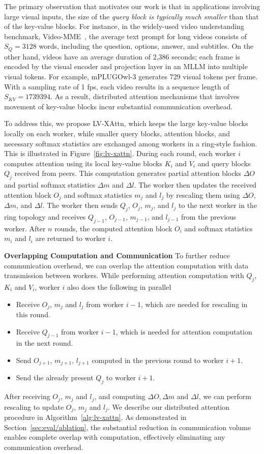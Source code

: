 The primary observation that motivates our work is that in applications involving large visual inputs, the size of the \emph{query block is typically much smaller} than that of the key-value blocks. For instance, in the widely-used video understanding benchmark, Video-MME~\cite{fu2024video-mme}, the average text prompt for long videos consists of $S_Q = 3128$ words, including the question, options, answer, and subtitles. On the other hand, videos have an average duration of 2,386 seconds; each frame is encoded by the visual encoder and projection layer in an MLLM into multiple visual tokens. For example, mPLUGOwl-3 generates 729 visual tokens per frame. With a sampling rate of 1 fps, each video results in a sequence length of $S_{KV} = 1739394$. As a result, distributed attention mechanisms that involves movement of key-value blocks incur substantial communication overhead.

To address this, we propose LV-XAttn, which keeps the large key-value blocks locally on each worker, while smaller query blocks, attention blocks, and necessary softmax statistics are exchanged among workers in a ring-style fashion. This is illustrated in Figure~\ref{fig:lv-xattn}. During each round, each worker $i$ computes attention using its local key-value blocks $K_i$ and $V_i$ and query blocks $Q_j$ received from peers. This computation generates partial attention blocks $\Delta O$ and partial softmax statistics $\Delta m$ and $\Delta l$. The worker then updates the received attention block $O_j$ and softmax statistics $m_j$ and $l_j$ by rescaling them using $\Delta O$, $\Delta m$, and $\Delta l$. The worker then sends $Q_j$, $O_j$, $m_j$, and $l_j$ to the next worker in the ring topology and receives $Q_{j-1}$, $O_{j-1}$, $m_{j-1}$, and $l_{j-1}$ from the previous worker. After $n$ rounds, the computed attention block $O_i$ and softmax statistics $m_i$ and $l_i$ are returned to worker $i$.

\textbf{Overlapping Computation and Communication} To further reduce communication overhead, we can overlap the attention computation with data transmission between workers. While performing attention computation with $Q_j$, $K_i$ and $V_i$, worker $i$ also does the following in parallel
\begin{itemize}
    \item Receive $O_j$, $m_j$ and $l_j$ from worker $i-1$, which are needed for rescaling in this round.
    \item Receive $Q_{j-1}$ from worker $i-1$, which is needed for attention computation in the next round.
    \item Send $O_{j+1}$, $m_{j+1}$, $l_{j+1}$ computed in the previous round to worker $i+1$.
    \item Send the already present $Q_j$ to worker $i+1$.
\end{itemize}
After receiving $O_j$, $m_j$ and $l_j$, and computing $\Delta O, \Delta m$ and $\Delta l$, we can perform rescaling to update $O_j$, $m_j$ and $l_j$. We describe our distributed attention procedure in Algorithm~\ref{alg:lv-xattn}. As demonstrated in Section~\ref{sec:eval/ablation}, the substantial reduction in communication volume enables complete overlap with computation, effectively eliminating any communication overhead.


